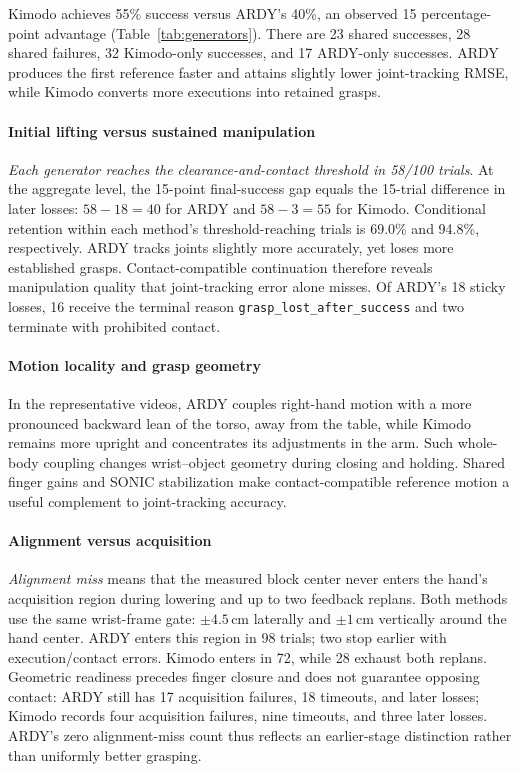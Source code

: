 \documentclass[letterpaper,10pt,conference]{ieeeconf}
\begin{document}
Kimodo achieves 55\% success versus ARDY's 40\%, an observed 15 percentage-point advantage (Table~\ref{tab:generators}). There are 23 shared successes, 28 shared failures, 32 Kimodo-only successes, and 17 ARDY-only successes. ARDY produces the first reference faster and attains slightly lower joint-tracking RMSE, while Kimodo converts more executions into retained grasps.

\paragraph{Initial lifting versus sustained manipulation}
\emph{Each generator reaches the clearance-and-contact threshold in 58/100 trials}. At the aggregate level, the 15-point final-success gap equals the 15-trial difference in later losses: $58-18=40$ for ARDY and $58-3=55$ for Kimodo. Conditional retention within each method's threshold-reaching trials is 69.0\% and 94.8\%, respectively. ARDY tracks joints slightly more accurately, yet loses more established grasps. Contact-compatible continuation therefore reveals manipulation quality that joint-tracking error alone misses. Of ARDY's 18 sticky losses, 16 receive the terminal reason \texttt{grasp\_lost\_after\_success} and two terminate with prohibited contact.

\paragraph{Motion locality and grasp geometry}
In the representative videos, ARDY couples right-hand motion with a more pronounced backward lean of the torso, away from the table, while Kimodo remains more upright and concentrates its adjustments in the arm. Such whole-body coupling changes wrist--object geometry during closing and holding. Shared finger gains and SONIC stabilization make contact-compatible reference motion a useful complement to joint-tracking accuracy.

\paragraph{Alignment versus acquisition}
\emph{Alignment miss} means that the measured block center never enters the hand's acquisition region during lowering and up to two feedback replans. Both methods use the same wrist-frame gate: $\pm4.5$\,cm laterally and $\pm1$\,cm vertically around the hand center. ARDY enters this region in 98 trials; two stop earlier with execution/contact errors. Kimodo enters in 72, while 28 exhaust both replans. Geometric readiness precedes finger closure and does not guarantee opposing contact: ARDY still has 17 acquisition failures, 18 timeouts, and later losses; Kimodo records four acquisition failures, nine timeouts, and three later losses. ARDY's zero alignment-miss count thus reflects an earlier-stage distinction rather than uniformly better grasping.
\end{document}
